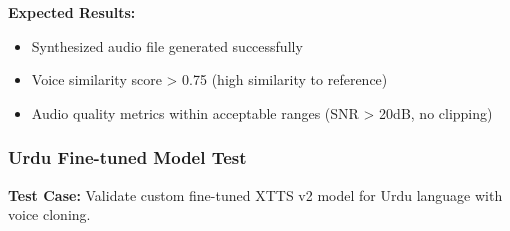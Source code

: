 \textbf{Expected Results:}
\begin{itemize}
    \item Synthesized audio file generated successfully
    \item Voice similarity score > 0.75 (high similarity to reference)
    \item Audio quality metrics within acceptable ranges (SNR > 20dB, no clipping)
\end{itemize}

\subsubsection{Urdu Fine-tuned Model Test}

\textbf{Test Case:} Validate custom fine-tuned XTTS v2 model for Urdu language with voice cloning.

